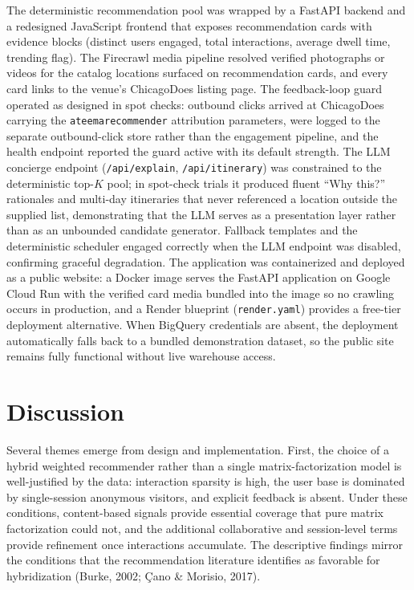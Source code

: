 \documentclass[12pt,letterpaper]{article}
\newcommand{\codeunderscore}{\discretionary{\textunderscore}{}{\textunderscore}}
\newcommand{\code}[1]{\begingroup\let\_\codeunderscore\texttt{\small #1}\endgroup}
\begin{document}
The deterministic recommendation pool was wrapped by a FastAPI
backend and a redesigned JavaScript frontend that exposes
recommendation cards with evidence blocks (distinct users engaged,
total interactions, average dwell time, trending flag). The
Firecrawl media pipeline resolved verified photographs or videos for
the catalog locations surfaced on recommendation cards, and every
card links to the venue's ChicagoDoes listing page. The
feedback-loop guard operated as designed in spot checks: outbound
clicks arrived at ChicagoDoes carrying the
\code{ateema\_recommender} attribution parameters, were logged to
the separate outbound-click store rather than the engagement
pipeline, and the health endpoint reported the guard active with its
default strength. The LLM concierge endpoint
(\code{/api/explain}, \code{/api/itinerary}) was constrained to the
deterministic top-$K$ pool; in spot-check trials it produced
fluent ``Why this?'' rationales and multi-day itineraries that never
referenced a location outside the supplied list, demonstrating that
the LLM serves as a presentation layer rather than as an unbounded
candidate generator. Fallback templates and the deterministic
scheduler engaged correctly when the LLM endpoint was disabled,
confirming graceful degradation. The application was containerized
and deployed as a public website: a Docker image serves the FastAPI
application on Google Cloud Run with the verified card media bundled
into the image so no crawling occurs in production, and a Render
blueprint (\code{render.yaml}) provides a free-tier deployment
alternative. When BigQuery credentials are absent, the deployment
automatically falls back to a bundled demonstration dataset, so the
public site remains fully functional without live warehouse access.

\section{Discussion}\label{sec:discussion}

Several themes emerge from design and implementation. First, the
choice of a hybrid weighted recommender rather than a single
matrix-factorization model is well-justified by the data: interaction
sparsity is high, the user base is dominated by single-session
anonymous visitors, and explicit feedback is absent. Under these
conditions, content-based signals provide essential coverage that
pure matrix factorization could not, and the additional collaborative
and session-level terms provide refinement once interactions
accumulate. The descriptive findings mirror
the conditions that the recommendation literature identifies as
favorable for hybridization (Burke, 2002; \c{C}ano \& Morisio, 2017).
\end{document}
